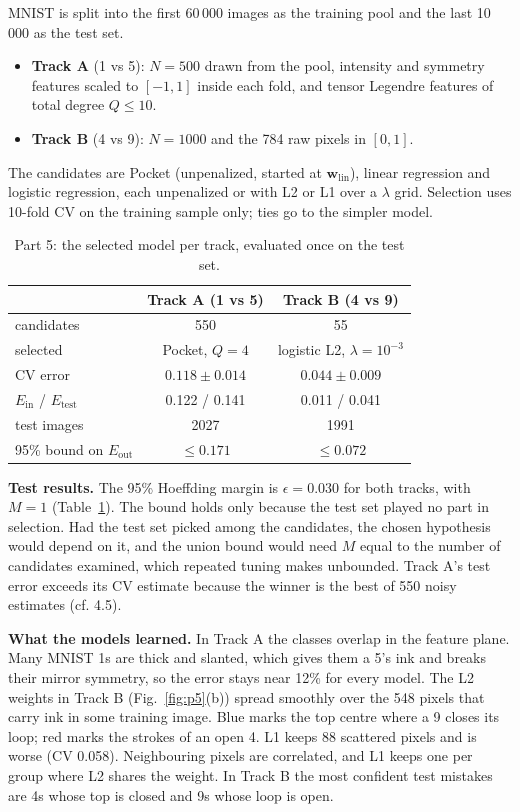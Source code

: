 \documentclass[conference]{IEEEtran}
\newcommand{\Ein}{E_{\mathrm{in}}}
\newcommand{\Eout}{E_{\mathrm{out}}}
\newcommand{\wlin}{\mathbf{w}_{\mathrm{lin}}}
\begin{document}
MNIST is split into the first 60\,000 images as the training pool and the last 10\,000 as the test set.
\begin{itemize}
\item \textbf{Track A} (1 vs 5): $N=500$ drawn from the pool, intensity and symmetry features scaled to $[-1,1]$ inside each fold, and tensor Legendre features of total degree $Q\le10$.
\item \textbf{Track B} (4 vs 9): $N=1000$ and the 784 raw pixels in $[0,1]$.
\end{itemize}
The candidates are Pocket (unpenalized, started at $\wlin$), linear regression and logistic regression, each unpenalized or with L2 or L1 over a $\lambda$ grid. Selection uses 10-fold CV on the training sample only; ties go to the simpler model.

\begin{table}[!t]
\caption{Part 5: the selected model per track, evaluated once on the test set.}
\label{tab:p5}
\centering\footnotesize
\begin{tabular}{lcc}
\toprule
 & Track A (1 vs 5) & Track B (4 vs 9)\\
\midrule
candidates & 550 & 55\\
selected & Pocket, $Q=4$ & logistic L2, $\lambda=10^{-3}$\\
CV error & $0.118\pm0.014$ & $0.044\pm0.009$\\
$\Ein$ / $E_{\mathrm{test}}$ & 0.122 / 0.141 & 0.011 / 0.041\\
test images & 2027 & 1991\\
95\% bound on $\Eout$ & $\le0.171$ & $\le0.072$\\
\bottomrule
\end{tabular}
\end{table}

\textbf{Test results.} The 95\% Hoeffding margin is $\epsilon=0.030$ for both tracks, with $M=1$ (Table~\ref{tab:p5}). The bound holds only because the test set played no part in selection. Had the test set picked among the candidates, the chosen hypothesis would depend on it, and the union bound would need $M$ equal to the number of candidates examined, which repeated tuning makes unbounded. Track A's test error exceeds its CV estimate because the winner is the best of 550 noisy estimates (cf. 4.5).

\textbf{What the models learned.} In Track A the classes overlap in the feature plane. Many MNIST 1s are thick and slanted, which gives them a 5's ink and breaks their mirror symmetry, so the error stays near 12\% for every model. The L2 weights in Track B (Fig.~\ref{fig:p5}(b)) spread smoothly over the 548 pixels that carry ink in some training image. Blue marks the top centre where a 9 closes its loop; red marks the strokes of an open 4. L1 keeps 88 scattered pixels and is worse (CV 0.058). Neighbouring pixels are correlated, and L1 keeps one per group where L2 shares the weight. In Track B the most confident test mistakes are 4s whose top is closed and 9s whose loop is open.
\end{document}
